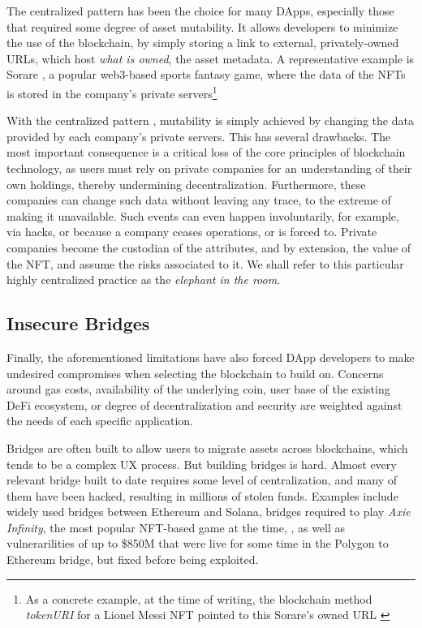 The centralized pattern  has been the choice for many DApps,
especially those that required some degree of asset mutability.
It allows developers to minimize the use
of the blockchain, by simply storing a link to external, privately-owned URLs, which
host {\it what is owned}, the asset metadata. A representative example 
is Sorare \cite{sorare},
a popular web3-based sports fantasy game, where the data of the NFTs
is stored in the company's private servers\footnote{As a concrete example, at the time of writing,
the blockchain method {\it tokenURI} for a Lionel Messi NFT \cite{messiOpenSea} pointed to
this Sorare's owned URL \cite{messiOnSorare}}

With the centralized pattern , mutability is simply achieved by changing the data
provided by each company's private servers. This has several drawbacks. The most important
consequence is a critical loss of the core principles
of blockchain technology, as users must rely on private companies
for an understanding of their own holdings, thereby undermining decentralization.
Furthermore, these companies can change such data without leaving any trace, to the extreme 
of making it unavailable. Such events can even happen involuntarily, for example, 
via hacks, or because a company ceases operations, or is forced to. 
Private companies become the custodian of the attributes, and by extension,
the value of the NFT, and assume the risks associated to it. 
We shall refer to this particular highly centralized practice as the {\it elephant in the room}.

\subsection{Insecure Bridges}\label{bridges}

Finally, the aforementioned limitations have also forced DApp developers 
to make undesired compromises when selecting the blockchain to build on.
Concerns around gas costs, availability of the underlying coin, user base 
of the existing DeFi ecosystem, or degree of decentralization and
security are weighted against the needs of each specific application.

Bridges are often built to allow users to migrate assets across blockchains,
which tends to be a complex UX process.
But building bridges is hard. Almost every relevant
bridge built to date requires some level of centralization,
and many of them have been hacked\cite{lee2022sok},
resulting in millions of stolen funds. Examples include
widely used bridges between Ethereum and Solana\cite{eth-solana},
bridges required to play {\it Axie Infinity},
the most popular NFT-based game at the time\cite{axie-bridge-1}, \cite{axie-bridge-2},
as well as vulnerarilities of up to \$850M that 
were live for some time in the Polygon to Ethereum bridge,
but fixed before being exploited\cite{polygon-hack}.


